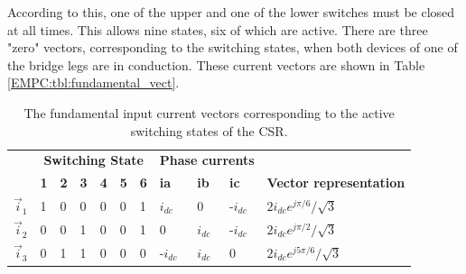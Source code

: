     According to this, one of the upper and one of the lower switches must be closed at all times. This allows nine states, six of which are active. There are three "zero" vectors, corresponding to the switching states, when both devices of one of the bridge legs are in conduction. These current vectors are shown in Table \ref{EMPC:tbl:fundamental_vect}.



\begin{table}[]
\caption{The fundamental input current vectors corresponding to the active switching states of the CSR.}
    \begin{tabular}{|l|l|l|l|l|l|l|l|l|l|l|}
    \hline
    \rowcolor[HTML]{EFEFEF}
    \multicolumn{1}{|c|}{\cellcolor[HTML]{EFEFEF}}                                & \multicolumn{6}{c|}{\cellcolor[HTML]{EFEFEF}\textbf{Switching State}}       & \multicolumn{3}{l|}{\cellcolor[HTML]{EFEFEF}\textbf{Phase currents}} & \multicolumn{1}{c|}{\cellcolor[HTML]{EFEFEF}}                                                 \\ \cline{2-10}
    \rowcolor[HTML]{EFEFEF}
    \multicolumn{1}{|c|}{\multirow{-2}{*}{\cellcolor[HTML]{EFEFEF}\textbf{Name}}} & \textbf{1} & \textbf{2} & \textbf{3} & \textbf{4} & \textbf{5} & \textbf{6} & \textbf{ia}           & \textbf{ib}           & \textbf{ic}          & \multicolumn{1}{c|}{\multirow{-2}{*}{\cellcolor[HTML]{EFEFEF}\textbf{Vector representation}}} \\ \hline
    $\vec{i}_1$                                                                           & 1          & 0          & 0          & 0          & 0          & 1          & $i_{dc}$                   & 0                     & -$i_{dc}$                 & $2i_{dc}e^{j\pi/6}/\sqrt{3}$                                                                                           \\ \hline
    $\vec{i}_2$                                                                            & 0          & 0          & 1          & 0          & 0          & 1          & 0                     & $i_{dc}$                   & -$i_{dc}$                 & $2i_{dc}e^{j\pi/2}/\sqrt{3}$                                                                                           \\ \hline
    $\vec{i}_3$                                                                            & 0          & 1          & 1          & 0          & 0          & 0          & -$i_{dc}$                  & $i_{dc}$                   & 0                    & $2i_{dc}e^{j5\pi/6}/\sqrt{3}$                                                                                          \\ \hline

\end{tabular}
\end{table}
